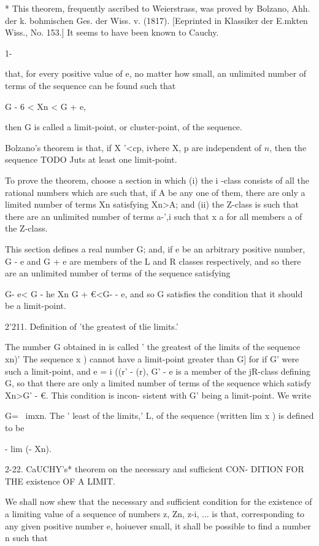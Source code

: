 * This theorem, frequently ascribed to Weierstrass, was proved by
Bolzano, Ahh. der k. bohmischen Ges. der Wiss. v. (1817). [Eeprinted
in Klassiker der E.mkten Wiss., No. 153.] It seems to have been known
to Cauchy.

1-

%
%

that, for every positive value of e, no matter how small, an unlimited
number of terms of the sequence can be found such that

G - 6 < Xn < G + e,

then G is called a limit-point, or cluster-point, of the sequence.

Bolzano's theorem is that, if X '<cp, ivhere X, p are independent of
$n$, then the sequence TODO Juts at least one limit-point.

To prove the theorem, choose a section in which (i) the i -class
consists of all the rational numbers which are such that, if A be any
one of them, there are only a limited number of terms Xn satisfying
Xn>A; and (ii) the Z-class is such that there are an unlimited number
of terms a-',i such that x a for all members a of the Z-class.

This section defines a real number G; and, if e be an arbitrary
positive number, G - e and G + e are members of the L and R classes
respectively, and so there are an unlimited number of terms of the
sequence satisfying

G- e< G - he Xn G + €<G- - e, and so G satisfies the condition that it
should be a limit-point.

2'211. Definition of 'the greatest of tlie limits.'

The number G obtained in is called ' the greatest of the limits
of the sequence xn)' The sequence x ) cannot have a limit-point
greater than G] for if G' were such a limit-point, and e = i ((r' -
(r), G' - e is a member of the jR-class defining G, so that there are
only a limited number of terms of the sequence which satisfy Xn>G' -
€. This condition is incon- sistent with G' being a limit-point. We
write

G= \ imxn. The ' least of the limits,' L, of the sequence (written lim
x ) is defined to be

- lim (- Xn).

2-22. CaUCHY's* theorem on the necessary and sufficient CON- DITION
FOR THE existence OF A LIMIT.

We shall now shew that the necessary and sufficient condition for the
existence of a limiting value of a sequence of numbers z, Zn, z-i,
... is that, corresponding to any given positive number e, hoiuever
small, it shall be possible to find a number n such that

